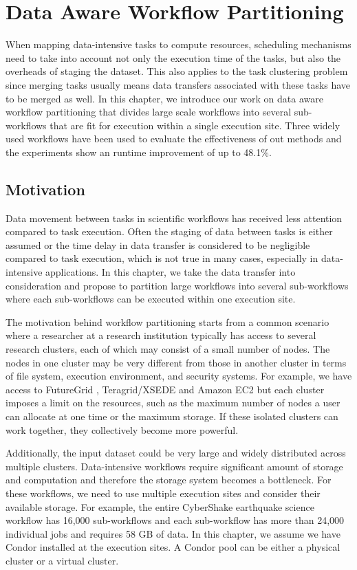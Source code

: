 \chapter{Data Aware Workflow Partitioning}

When mapping data-intensive tasks to compute resources, scheduling mechanisms need to take into account not only the execution time of the tasks, but also the overheads of staging the dataset. This also applies to the task clustering problem since merging tasks usually means data transfers associated with these tasks have to be merged as well. In this chapter, we introduce our work on data aware workflow partitioning that divides large scale workflows into several sub-workflows that are fit for execution within a single execution site. Three widely used workflows have been used to evaluate the effectiveness of out methods and the experiments show an runtime improvement of up to 48.1\%. 


\section{Motivation}

Data movement between tasks in scientific workflows has received less attention compared to task execution. Often the staging of data between tasks is either assumed or the time delay in data transfer is considered to be negligible compared to task execution, which is not true in many cases, especially in data-intensive applications. In this chapter, we take the data transfer into consideration and propose to partition large workflows into several sub-workflows where each sub-workflows can be executed within one execution site. 

The motivation behind workflow partitioning starts from a common scenario where a researcher at a research institution typically has access to several research clusters, each of which may consist of a small number of nodes. The nodes in one cluster may be very different from those in another cluster in terms of file system, execution environment, and security systems. For example, we have access to FutureGrid \cite{FutureGrid}, Teragrid/XSEDE \cite{TeraGrid}  and Amazon EC2 \cite{AmazonAWS} but each cluster imposes a limit on the resources, such as the maximum number of nodes a user can allocate at one time or the maximum storage. If these isolated clusters can work together, they collectively become more powerful.

Additionally, the input dataset could be very large and widely distributed across multiple clusters. Data-intensive workflows require significant amount of storage and computation and therefore the storage system becomes a bottleneck. For these workflows, we need to use multiple execution sites and consider their available storage. For example, the entire CyberShake earthquake science workflow has 16,000 sub-workflows and each sub-workflow has more than 24,000 individual jobs and requires 58 GB of data. In this chapter, we assume we have Condor installed at the execution sites. A Condor pool can be either a physical cluster or a virtual cluster. 

